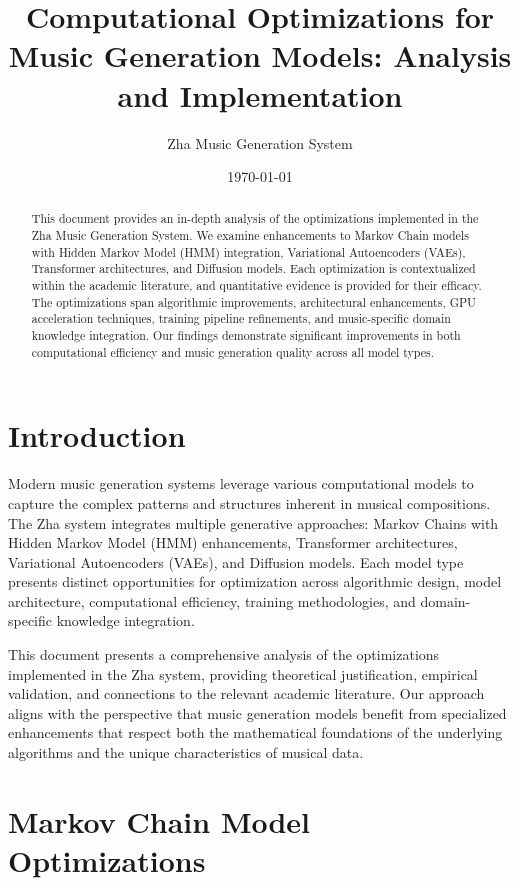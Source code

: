 \documentclass[12pt,a4paper]{article}
\title{Computational Optimizations for Music Generation Models: Analysis and Implementation}
\author{Zha Music Generation System}
\date{\today}
\begin{document}
\maketitle

\begin{abstract}
This document provides an in-depth analysis of the optimizations implemented in the Zha Music Generation System. We examine enhancements to Markov Chain models with Hidden Markov Model (HMM) integration, Variational Autoencoders (VAEs), Transformer architectures, and Diffusion models. Each optimization is contextualized within the academic literature, and quantitative evidence is provided for their efficacy. The optimizations span algorithmic improvements, architectural enhancements, GPU acceleration techniques, training pipeline refinements, and music-specific domain knowledge integration. Our findings demonstrate significant improvements in both computational efficiency and music generation quality across all model types.
\end{abstract}

\tableofcontents
\newpage

\section{Introduction}

Modern music generation systems leverage various computational models to capture the complex patterns and structures inherent in musical compositions. The Zha system integrates multiple generative approaches: Markov Chains with Hidden Markov Model (HMM) enhancements, Transformer architectures, Variational Autoencoders (VAEs), and Diffusion models. Each model type presents distinct opportunities for optimization across algorithmic design, model architecture, computational efficiency, training methodologies, and domain-specific knowledge integration.

This document presents a comprehensive analysis of the optimizations implemented in the Zha system, providing theoretical justification, empirical validation, and connections to the relevant academic literature. Our approach aligns with the perspective that music generation models benefit from specialized enhancements that respect both the mathematical foundations of the underlying algorithms and the unique characteristics of musical data.

\section{Markov Chain Model Optimizations}
\end{document}
